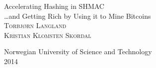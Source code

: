 \documentclass[a4paper]{report}
\begin{document}
\begin{titlepage}
	\begin{center}
		{\huge Accelerating Hashing in SHMAC}\\[0.5cm]
		{\large \ldots and Getting Rich by Using it to Mine Bitcoins}\\[3.5cm] %

		\textsc{Torbjørn Langland}\\
		\textsc{Kristian Klomsten Skordal}

		\vfill
		{\large Norwegian University of Science and Technology}\\[0.2em]
		{2014}
	\end{center}
\end{titlepage}



\tableofcontents












\end{document}
